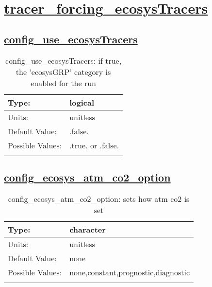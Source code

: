\section[tracer\_forcing\_ecosysTracers]{\hyperref[sec:nm_tab_tracer_forcing_ecosysTracers]{tracer\_forcing\_ecosysTracers}}
\label{sec:nm_sec_tracer_forcing_ecosysTracers}
\subsection[config\_use\_ecosysTracers]{\hyperref[sec:nm_tab_tracer_forcing_ecosysTracers]{config\_use\_ecosysTracers}}
\label{subsec:nm_sec_config_use_ecosysTracers}
\begin{center}
\begin{longtable}{| p{2.0in} || p{4.0in} |}
    \hline
    Type: & logical \\
    \hline
    Units: & \si{unitless} \\
    \hline
    Default Value: & .false. \\
    \hline
    Possible Values: & .true. or .false. \\
    \hline
    \caption{config\_use\_ecosysTracers: if true, the 'ecosysGRP' category is enabled for the run}
\end{longtable}
\end{center}
\subsection[config\_ecosys\_atm\_co2\_option]{\hyperref[sec:nm_tab_tracer_forcing_ecosysTracers]{config\_ecosys\_atm\_co2\_option}}
\label{subsec:nm_sec_config_ecosys_atm_co2_option}
\begin{center}
\begin{longtable}{| p{2.0in} || p{4.0in} |}
    \hline
    Type: & character \\
    \hline
    Units: & \si{unitless} \\
    \hline
    Default Value: & none \\
    \hline
    Possible Values: & none,constant,prognostic,diagnostic \\
    \hline
    \caption{config\_ecosys\_atm\_co2\_option: sets how atm co2 is set}
\end{longtable}
\end{center}
